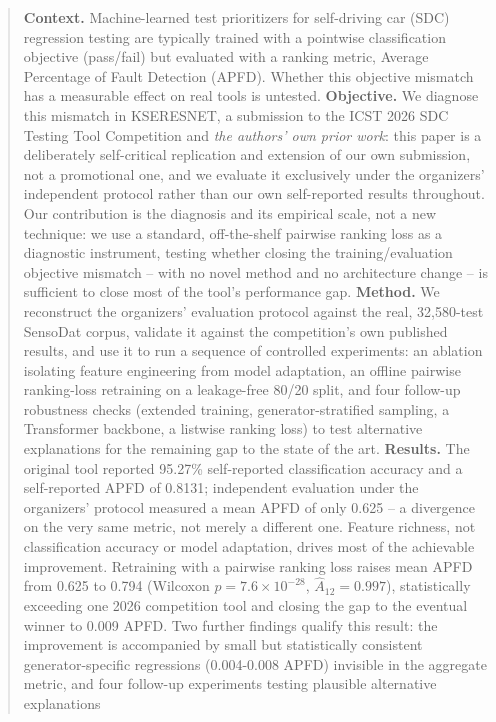 \documentclass[smallextended]{svjour3}
\begin{document}
\begin{abstract}
\textbf{Context.} Machine-learned test prioritizers for self-driving car
(SDC) regression testing are typically trained with a pointwise
classification objective (pass/fail) but evaluated with a ranking metric,
Average Percentage of Fault Detection (APFD). Whether this objective
mismatch has a measurable effect on real tools is untested.
\textbf{Objective.} We diagnose this mismatch in KSERESNET, a submission to
the ICST 2026 SDC Testing Tool Competition and \emph{the authors' own
prior work}: this paper is a deliberately self-critical replication and
extension of our own submission, not a promotional one, and we evaluate
it exclusively under the organizers' independent protocol rather than our
own self-reported results throughout. Our contribution is the
diagnosis and its empirical scale, not a new technique: we use a standard,
off-the-shelf pairwise ranking loss as a diagnostic instrument, testing
whether closing the training/evaluation objective mismatch -- with no
novel method and no architecture change -- is sufficient to close most of
the tool's performance gap.
\textbf{Method.} We reconstruct the organizers' evaluation protocol against
the real, 32{,}580-test SensoDat corpus, validate it against the
competition's own published results, and use it to run a sequence of
controlled experiments: an ablation isolating feature engineering from
model adaptation, an offline pairwise ranking-loss retraining on a
leakage-free 80/20 split, and four follow-up robustness checks (extended
training, generator-stratified sampling, a Transformer backbone, a
listwise ranking loss) to test
alternative explanations for the remaining gap to the state of the art.
\textbf{Results.} The original tool reported 95.27\% self-reported
classification accuracy and a self-reported APFD of 0.8131; independent
evaluation under the organizers' protocol measured a mean APFD of only
0.625 -- a divergence on the very same metric, not merely a different one.
Feature richness, not classification accuracy or model
adaptation, drives most of the achievable improvement. Retraining with a
pairwise ranking loss raises mean APFD from 0.625 to 0.794 (Wilcoxon
$p=7.6\times10^{-28}$, $\hat{A}_{12}=0.997$), statistically exceeding one
2026 competition tool and closing the gap to the eventual winner to 0.009
APFD. Two further findings qualify this result: the improvement is
accompanied by small but statistically consistent generator-specific
regressions (0.004-0.008 APFD) invisible in the aggregate metric, and
four follow-up experiments testing plausible alternative explanations

\end{abstract}
\end{document}
